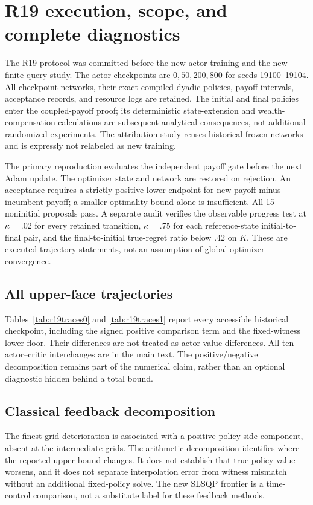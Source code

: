 \section{R19 execution, scope, and complete diagnostics}\label{sec:r19supp}
The R19 protocol was committed before the new actor training and the new finite-query study. The actor checkpoints are $0,50,200,800$ for seeds 19100--19104. All checkpoint networks, their exact compiled dyadic policies, payoff intervals, acceptance records, and resource logs are retained. The initial and final policies enter the coupled-payoff proof; its deterministic state-extension and wealth-compensation calculations are subsequent analytical consequences, not additional randomized experiments. The attribution study reuses historical frozen networks and is expressly not relabeled as new training.

The primary reproduction evaluates the independent payoff gate before the next Adam update. The optimizer state and network are restored on rejection. An acceptance requires a strictly positive lower endpoint for new payoff minus incumbent payoff; a smaller optimality bound alone is insufficient. All 15 noninitial proposals pass. A separate audit verifies the observable progress test at $\kappa=.02$ for every retained transition, $\kappa=.75$ for each reference-state initial-to-final pair, and the final-to-initial true-regret ratio below $.42$ on $K$. These are executed-trajectory statements, not an assumption of global optimizer convergence.

\subsection{All upper-face trajectories}
Tables~\ref{tab:r19traces0} and \ref{tab:r19traces1} report every accessible historical checkpoint, including the signed positive comparison term and the fixed-witness lower floor. Their differences are not treated as actor-value differences. All ten actor--critic interchanges are in the main text. The positive/negative decomposition remains part of the numerical claim, rather than an optional diagnostic hidden behind a total bound.



\subsection{Classical feedback decomposition}

The finest-grid deterioration is associated with a positive policy-side component, absent at the intermediate grids. The arithmetic decomposition identifies where the reported upper bound changes. It does not establish that true policy value worsens, and it does not separate interpolation error from witness mismatch without an additional fixed-policy solve. The new SLSQP frontier is a time-control comparison, not a substitute label for these feedback methods.

